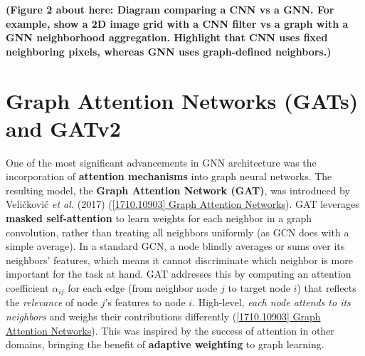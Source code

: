 \documentclass[12pt,a4paper]{report}
\begin{document}
\textbf{(Figure 2 about here: Diagram comparing a CNN vs a GNN. For example, show a 2D image grid with a CNN filter vs a graph with a GNN neighborhood aggregation. Highlight that CNN uses fixed neighboring pixels, whereas GNN uses graph-defined neighbors.)}

\chapter{Graph Attention Networks (GATs) and GATv2}

One of the most significant advancements in GNN architecture was the incorporation of \textbf{attention mechanisms} into graph neural networks. The resulting model, the \textbf{Graph Attention Network (GAT)}, was introduced by Veličković \textit{et al.} (2017) (\href{https://arxiv.org/abs/1710.10903#:~:text=attentional%20layers%20to%20address%20the,Our%20GAT%20models%20have}{[1710.10903] Graph Attention Networks}). GAT leverages \textbf{masked self-attention} to learn weights for each neighbor in a graph convolution, rather than treating all neighbors uniformly (as GCN does with a simple average). In a standard GCN, a node blindly averages or sums over its neighbors’ features, which means it cannot discriminate which neighbor is more important for the task at hand. GAT addresses this by computing an attention coefficient \(\alpha_{ij}\) for each edge (from neighbor node \(j\) to target node \(i\)) that reflects the \textit{relevance} of node \(j\)’s features to node \(i\). High-level, \textit{each node attends to its neighbors} and weighs their contributions differently (\href{https://arxiv.org/abs/1710.10903#:~:text=attentional%20layers%20to%20address%20the,Our%20GAT%20models%20have}{[1710.10903] Graph Attention Networks}). This was inspired by the success of attention in other domains, bringing the benefit of \textbf{adaptive weighting} to graph learning.
\end{document}
